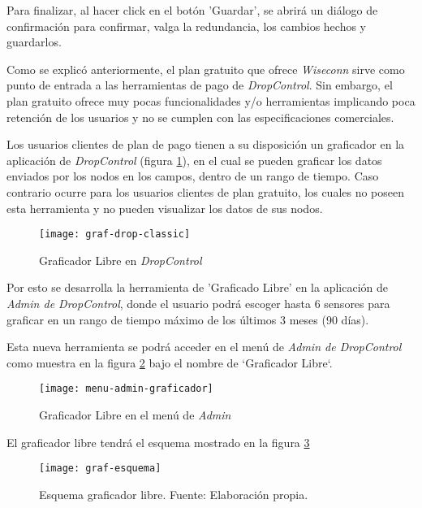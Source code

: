 Para finalizar, al hacer click en el botón 'Guardar', se abrirá un diálogo de confirmación para confirmar, valga la redundancia, los cambios hechos y guardarlos.


Como se explicó anteriormente, el plan gratuito que ofrece \textit{Wiseconn} sirve como punto de entrada a las herramientas
de pago de \textit{DropControl}. Sin embargo, el plan gratuito ofrece muy pocas funcionalidades y/o herramientas
implicando poca retención de los usuarios y no se cumplen con las especificaciones comerciales.

Los usuarios clientes de plan de pago tienen a su disposición un graficador en la aplicación de \textit{DropControl} (figura \ref{fig:graf-drop-classic}), en el cual
se pueden graficar los datos enviados por los nodos en los campos, dentro de un rango de tiempo.
Caso contrario ocurre para los usuarios clientes de plan gratuito, los cuales no poseen esta herramienta y
no pueden visualizar los datos de sus nodos.

\begin{figure}[H]
	\centering
	\texttt{[image: graf-drop-classic]}
	\caption{\label{fig:graf-drop-classic} Graficador Libre en \textit{DropControl}}
\end{figure}

Por esto se desarrolla la herramienta de 'Graficado Libre' en la aplicación de \textit{Admin de DropControl},
donde el usuario podrá escoger hasta 6 sensores para graficar en un rango de tiempo máximo de los últimos 3 meses (90 días).

Esta nueva herramienta se podrá acceder en el menú de \textit{Admin de DropControl} como muestra en la figura \ref{fig:menu-admin-graf1} bajo el nombre de `Graficador Libre`. 

\begin{figure}[H]
	\centering
	\texttt{[image: menu-admin-graficador]}
	\caption{\label{fig:menu-admin-graf1} Graficador Libre en el menú de \textit{Admin}}
\end{figure}

El graficador libre tendrá el esquema mostrado en la figura \ref*{fig:graf-esquema}

\begin{figure}[H]
	\centering
	\texttt{[image: graf-esquema]}
	\caption{\label{fig:graf-esquema} Esquema graficador libre. Fuente: Elaboración propia.}
\end{figure}

